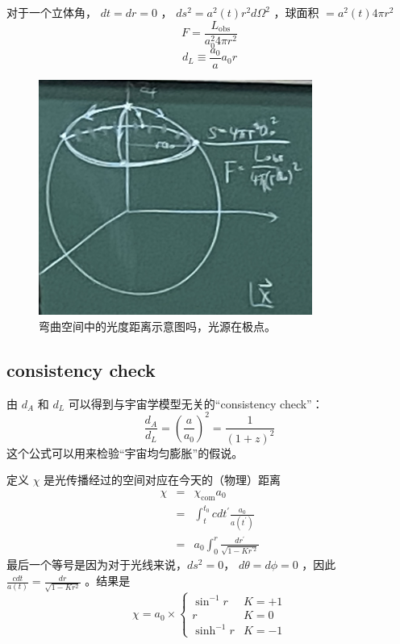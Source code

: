 \documentclass[12pt]{ctexart}
\begin{document}
对于一个立体角， $dt=dr=0$ ， $ds^2=a^2(t)r^2d\Omega^2$ ，球面积 $=a^2(t) 4\pi r^2$ 
\begin{equation}
    F = \frac{L_\text{obs}}{a_0^2 4\pi r^2}
\end{equation}
\begin{equation}
    d_L\equiv \frac{a_0}{a}a_0 r
\end{equation}

\begin{figure}[!hbtp]
    \centering
    \includegraphics[width=0.8\textwidth]{figures/d_L.png}
    \caption{弯曲空间中的光度距离示意图吗，光源在极点。}
\end{figure}


\subsection*{consistency check}
由 $d_A$ 和 $d_L$ 可以得到与宇宙学模型无关的“consistency check”：
\begin{equation}
    \frac{d_A}{d_L} = \left(\frac{a}{a_0}\right)^2 = \frac{1}{(1+z)^2}
\end{equation}  
这个公式可以用来检验“宇宙均匀膨胀”的假说。

定义 $\chi$ 是光传播经过的空间对应在今天的（物理）距离
\begin{eqnarray}
    \chi &=& \chi_\text{com} a_0 \\
        &=& \int_t^{t_0} c dt^\prime \frac{a_0}{a(t^\prime)} \label{eq:chidefine} \\ 
        &=& a_0 \int_0^r \frac{dr^\prime}{\sqrt{1-Kr^{\prime 2}}}
\end{eqnarray}
最后一个等号是因为对于光线来说，$ds^2=0$， $d\theta=d\phi = 0$ ，因此 $\frac{c dt}{a(t)}=\frac{dr}{\sqrt{1-Kr^2}}$ 。结果是
\begin{equation}
    \chi = a_0 \times
    \begin{cases}
        \sin^{-1} r & K=+1 \\ 
        r & K=0 \\ 
        \sinh^{-1} r & K=-1
    \end{cases}
\end{equation}
\end{document}
